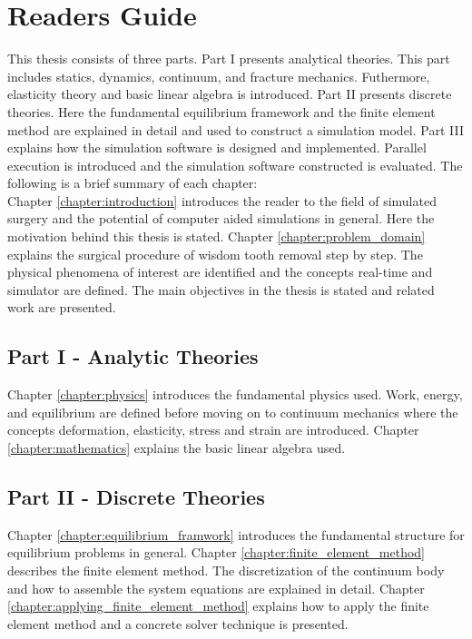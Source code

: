 
\chapter*{Readers Guide}
This thesis consists of three parts. Part I presents analytical
theories. This part includes statics, dynamics, continuum, and fracture
mechanics. Futhermore, elasticity theory and basic linear algebra is
introduced. Part II presents discrete theories. Here the fundamental
equilibrium framework and the finite element method are explained in
detail and used to construct a simulation model. Part III explains how
the simulation software is designed and implemented. Parallel
execution is introduced and the simulation software constructed is
evaluated.
%
The following is a brief summary of each chapter: \\ 

Chapter \ref{chapter:introduction} introduces the reader to the field
of simulated surgery and the potential of computer aided simulations
in general. Here the motivation behind this thesis is stated.
%
Chapter \ref{chapter:problem_domain} explains the surgical procedure
of wisdom tooth removal step by step. The physical phenomena of
interest are identified and the concepts real-time and simulator are
defined. The main objectives in the thesis is stated and related work
are presented.

\section*{Part I - Analytic Theories}
Chapter \ref{chapter:physics} introduces the fundamental physics
used. Work, energy, and equilibrium are defined before moving on to
continuum mechanics where the concepts deformation, elasticity,
stress and strain are introduced.
%
Chapter \ref{chapter:mathematics} explains the basic linear algebra
used.

\section*{Part II - Discrete Theories}
Chapter \ref{chapter:equilibrium_framwork} introduces the fundamental
structure for equilibrium problems in general.
%
Chapter \ref{chapter:finite_element_method} describes the finite
element method. The discretization of the continuum body and how
to assemble the system equations are explained in detail.
%
Chapter \ref{chapter:applying_finite_element_method} explains how to
apply the finite element method and a concrete solver technique is
presented.

